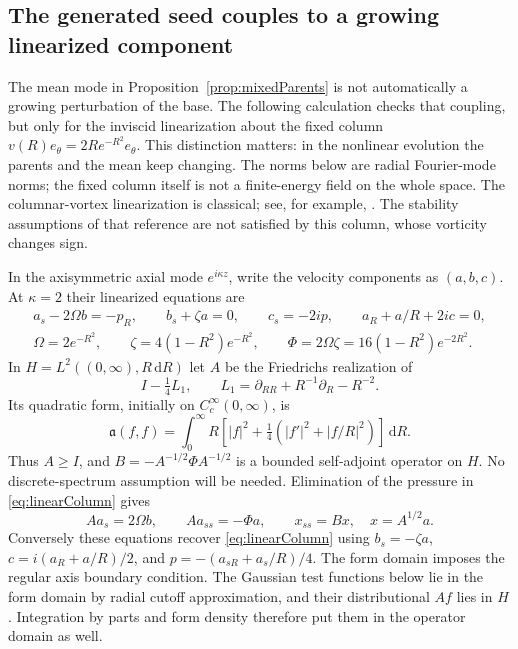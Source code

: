 \documentclass[11pt]{article}
\theoremstyle{remark}
\newcommand{\dd}{\,\mathrm d}
\begin{document}
\subsection{The generated seed couples to a growing linearized component}

The mean mode in Proposition~\ref{prop:mixedParents} is not automatically
a growing perturbation of the base. The following calculation checks
that coupling, but only for the inviscid linearization about the fixed
column $v(R)e_\theta=2Re^{-R^2}e_\theta$. This distinction matters:
in the nonlinear evolution the parents and the mean keep changing.
The norms below are radial Fourier-mode norms; the fixed column itself
is not a finite-energy field on the whole space.
The columnar-vortex linearization is classical; see, for example,
\cite[Eq.~(1.6)]{GS}. The stability assumptions of that reference are
not satisfied by this column, whose vorticity changes sign.

In the axisymmetric axial mode $e^{i\kappa z}$, write the velocity
components as $(a,b,c)$. At $\kappa=2$ their linearized equations are
\begin{gather}
 a_s-2\Omega b=-p_R,\qquad b_s+\zeta a=0,\qquad
 c_s=-2ip,\qquad a_R+a/R+2ic=0,\label{eq:linearColumn}\\
 \Omega=2e^{-R^2},\qquad \zeta=4(1-R^2)e^{-R^2},\qquad
 \Phi=2\Omega\zeta=16(1-R^2)e^{-2R^2}.
\end{gather}
In $H=L^2((0,\infty),R\dd R)$ let $A$ be the Friedrichs realization of
\[
 I-\tfrac14L_1,\qquad
 L_1=\partial_{RR}+R^{-1}\partial_R-R^{-2}.
\]
Its quadratic form, initially on $C_c^\infty(0,\infty)$, is
\[
 \mathfrak a(f,f)=\int_0^\infty
 R\left[|f|^2+\tfrac14(|f'|^2+|f/R|^2)\right]\dd R.
\]
Thus $A\geq I$, and $B=-A^{-1/2}\Phi A^{-1/2}$ is a bounded
self-adjoint operator on $H$. No discrete-spectrum assumption will be
needed. Elimination of the pressure in \eqref{eq:linearColumn} gives
\[
 Aa_s=2\Omega b,\qquad Aa_{ss}=-\Phi a,
 \qquad x_{ss}=Bx,\quad x=A^{1/2}a.
\]
Conversely these equations recover \eqref{eq:linearColumn} using
$b_s=-\zeta a$, $c=i(a_R+a/R)/2$, and
$p=-(a_{sR}+a_s/R)/4$. The form domain imposes the regular axis boundary
condition. The Gaussian test functions below lie in the form domain by
radial cutoff approximation, and their distributional $Af$ lies in $H$.
Integration by parts and form density therefore put them in the operator
domain as well.
\end{document}
